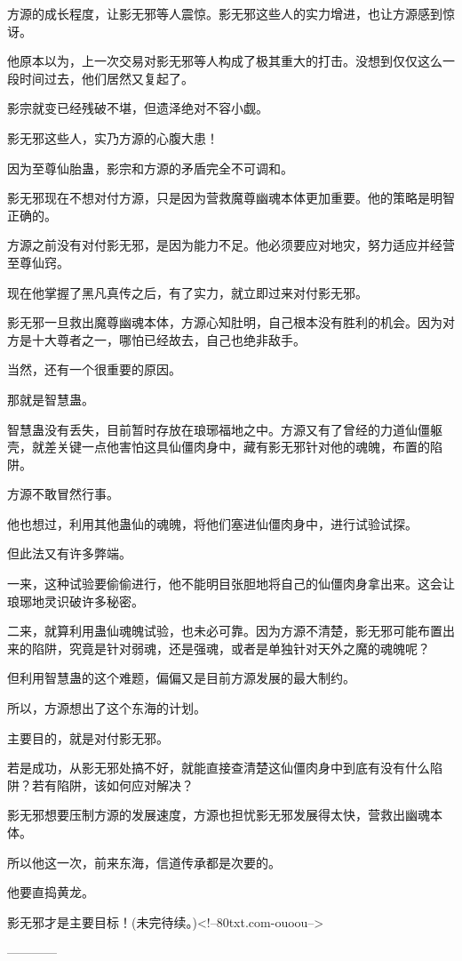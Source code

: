 \begin{this_body}
方源的成长程度，让影无邪等人震惊。影无邪这些人的实力增进，也让方源感到惊讶。

他原本以为，上一次交易对影无邪等人构成了极其重大的打击。没想到仅仅这么一段时间过去，他们居然又复起了。

影宗就变已经残破不堪，但遗泽绝对不容小觑。

影无邪这些人，实乃方源的心腹大患！

因为至尊仙胎蛊，影宗和方源的矛盾完全不可调和。

影无邪现在不想对付方源，只是因为营救魔尊幽魂本体更加重要。他的策略是明智正确的。

方源之前没有对付影无邪，是因为能力不足。他必须要应对地灾，努力适应并经营至尊仙窍。

现在他掌握了黑凡真传之后，有了实力，就立即过来对付影无邪。

影无邪一旦救出魔尊幽魂本体，方源心知肚明，自己根本没有胜利的机会。因为对方是十大尊者之一，哪怕已经故去，自己也绝非敌手。

当然，还有一个很重要的原因。

那就是智慧蛊。

智慧蛊没有丢失，目前暂时存放在琅琊福地之中。方源又有了曾经的力道仙僵躯壳，就差关键一点他害怕这具仙僵肉身中，藏有影无邪针对他的魂魄，布置的陷阱。

方源不敢冒然行事。

他也想过，利用其他蛊仙的魂魄，将他们塞进仙僵肉身中，进行试验试探。

但此法又有许多弊端。

一来，这种试验要偷偷进行，他不能明目张胆地将自己的仙僵肉身拿出来。这会让琅琊地灵识破许多秘密。

二来，就算利用蛊仙魂魄试验，也未必可靠。因为方源不清楚，影无邪可能布置出来的陷阱，究竟是针对弱魂，还是强魂，或者是单独针对天外之魔的魂魄呢？

但利用智慧蛊的这个难题，偏偏又是目前方源发展的最大制约。

所以，方源想出了这个东海的计划。

主要目的，就是对付影无邪。

若是成功，从影无邪处搞不好，就能直接查清楚这仙僵肉身中到底有没有什么陷阱？若有陷阱，该如何应对解决？

影无邪想要压制方源的发展速度，方源也担忧影无邪发展得太快，营救出幽魂本体。

所以他这一次，前来东海，信道传承都是次要的。

他要直捣黄龙。

影无邪才是主要目标！(未完待续。)<!--80txt.com-ouoou-->

------------

\end{this_body}

